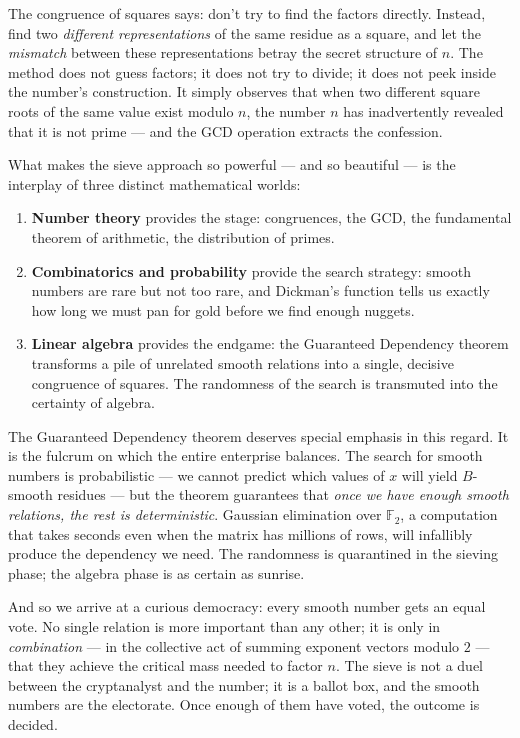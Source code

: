 The congruence of squares says: don't try to find the factors directly. Instead, find two \textit{different representations} of the same residue as a square, and let the \textit{mismatch} between these representations betray the secret structure of $n$. The method does not guess factors; it does not try to divide; it does not peek inside the number's construction. It simply observes that when two different square roots of the same value exist modulo $n$, the number $n$ has inadvertently revealed that it is not prime --- and the GCD operation extracts the confession.

What makes the sieve approach so powerful --- and so beautiful --- is the interplay of three distinct mathematical worlds:

\begin{enumerate}
\item \textbf{Number theory} provides the stage: congruences, the GCD, the fundamental theorem of arithmetic, the distribution of primes.
\item \textbf{Combinatorics and probability} provide the search strategy: smooth numbers are rare but not too rare, and Dickman's function tells us exactly how long we must pan for gold before we find enough nuggets.
\item \textbf{Linear algebra} provides the endgame: the Guaranteed Dependency theorem transforms a pile of unrelated smooth relations into a single, decisive congruence of squares. The randomness of the search is transmuted into the certainty of algebra.
\end{enumerate}
The Guaranteed Dependency theorem deserves special emphasis in this regard. It is the fulcrum on which the entire enterprise balances. The search for smooth numbers is probabilistic --- we cannot predict which values of $x$ will yield $B$-smooth residues --- but the theorem guarantees that \textit{once we have enough smooth relations, the rest is deterministic}. Gaussian elimination over $\mathbb{F}_2$, a computation that takes seconds even when the matrix has millions of rows, will infallibly produce the dependency we need. The randomness is quarantined in the sieving phase; the algebra phase is as certain as sunrise.

And so we arrive at a curious democracy: every smooth number gets an equal vote. No single relation is more important than any other; it is only in \textit{combination} --- in the collective act of summing exponent vectors modulo $2$ --- that they achieve the critical mass needed to factor $n$. The sieve is not a duel between the cryptanalyst and the number; it is a ballot box, and the smooth numbers are the electorate. Once enough of them have voted, the outcome is decided.

